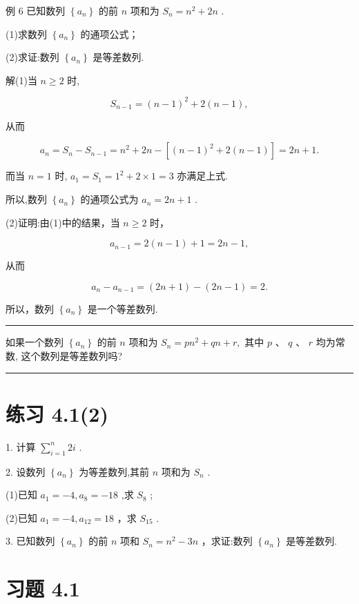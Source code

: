 \documentclass[10pt]{article}
\newcommand{\HRule}{\begin{center}\rule{0.9\linewidth}{0.2mm}\end{center}}
\begin{document}
例 6 已知数列 \(\left\{  {a}_{n}\right\}\) 的前 \(n\) 项和为 \({S}_{n} = {n}^{2} + {2n}\) .

(1)求数列 \(\left\{  {a}_{n}\right\}\) 的通项公式；

(2)求证:数列 \(\left\{  {a}_{n}\right\}\) 是等差数列.

解(1)当 \(n \geq  2\) 时,

\[
{S}_{n - 1} = {\left( n - 1\right) }^{2} + 2\left( {n - 1}\right) ,
\]

从而

\[
{a}_{n} = {S}_{n} - {S}_{n - 1} = {n}^{2} + {2n} - \left\lbrack  {{\left( n - 1\right) }^{2} + 2\left( {n - 1}\right) }\right\rbrack   = {2n} + 1.
\]

而当 \(n = 1\) 时, \({a}_{1} = {S}_{1} = {1}^{2} + 2 \times  1 = 3\) 亦满足上式.

所以,数列 \(\left\{  {a}_{n}\right\}\) 的通项公式为 \({a}_{n} = {2n} + 1\) .

(2)证明:由(1)中的结果，当 \(n \geq  2\) 时，

\[
{a}_{n - 1} = 2\left( {n - 1}\right)  + 1 = {2n} - 1,
\]

从而

\[
{a}_{n} - {a}_{n - 1} = \left( {{2n} + 1}\right)  - \left( {{2n} - 1}\right)  = 2.
\]

所以，数列 \(\left\{  {a}_{n}\right\}\) 是一个等差数列.

\HRule

如果一个数列 \(\left\{  {a}_{n}\right\}\) 的前 \(n\) 项和为 \({S}_{n} = p{n}^{2} + {qn} + r,\) 其中 \(p\text{ 、 }q\text{ 、 }r\) 均为常数, 这个数列是等差数列吗?

\HRule

\section*{练习 4.1(2)}

1. 计算 \(\mathop{\sum }\limits_{{i = 1}}^{n}{2i}\) .

2. 设数列 \(\left\{  {a}_{n}\right\}\) 为等差数列,其前 \(n\) 项和为 \({S}_{n}\) .

(1)已知 \({a}_{1} =  - 4,{a}_{8} =  - {18}\) ,求 \({S}_{8}\) ;

(2)已知 \({a}_{1} =  - 4,{a}_{12} = {18}\) ，求 \({S}_{15}\) .

3. 已知数列 \(\left\{  {a}_{n}\right\}\) 的前 \(n\) 项和 \({S}_{n} = {n}^{2} - {3n}\) ，求证:数列 \(\left\{  {a}_{n}\right\}\) 是等差数列.

\section*{习题 4.1}
\end{document}
